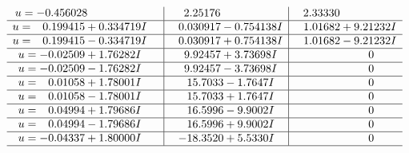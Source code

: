 \documentclass[1p]{elsarticle_modified}
\theoremstyle{definition}
\begin{document}
$$\begin{array}{c|c|c}
\begin{aligned}
u &= -0.456028\phantom{ +0.000000I}\end{aligned}
 & \phantom{-}2.25176\phantom{ +0.000000I} & \phantom{-}2.33330\phantom{ +0.000000I} \\ \hline\begin{aligned}
u &= \phantom{-}0.199415 + 0.334719 I\end{aligned}
 & \phantom{-}0.030917 - 0.754138 I & \phantom{-}1.01682 + 9.21232 I \\ \hline\begin{aligned}
u &= \phantom{-}0.199415 - 0.334719 I\end{aligned}
 & \phantom{-}0.030917 + 0.754138 I & \phantom{-}1.01682 - 9.21232 I \\ \hline\begin{aligned}
u &= -0.02509 + 1.76282 I\end{aligned}
 & \phantom{-}9.92457 + 3.73698 I & \phantom{-0.000000 } 0 \\ \hline\begin{aligned}
u &= -0.02509 - 1.76282 I\end{aligned}
 & \phantom{-}9.92457 - 3.73698 I & \phantom{-0.000000 } 0 \\ \hline\begin{aligned}
u &= \phantom{-}0.01058 + 1.78001 I\end{aligned}
 & \phantom{-}15.7033 - 1.7647 I & \phantom{-0.000000 } 0 \\ \hline\begin{aligned}
u &= \phantom{-}0.01058 - 1.78001 I\end{aligned}
 & \phantom{-}15.7033 + 1.7647 I & \phantom{-0.000000 } 0 \\ \hline\begin{aligned}
u &= \phantom{-}0.04994 + 1.79686 I\end{aligned}
 & \phantom{-}16.5996 - 9.9002 I & \phantom{-0.000000 } 0 \\ \hline\begin{aligned}
u &= \phantom{-}0.04994 - 1.79686 I\end{aligned}
 & \phantom{-}16.5996 + 9.9002 I & \phantom{-0.000000 } 0 \\ \hline\begin{aligned}
u &= -0.04337 + 1.80000 I\end{aligned}
 & -18.3520 + 5.5330 I & \phantom{-0.000000 } 0\\
 \hline 
 \end{array}$$\newpage$$\begin{array}{c|c|c}  

\end{array}$$
\end{document}
